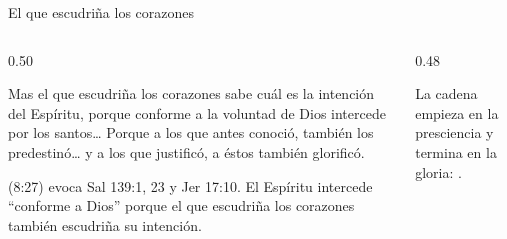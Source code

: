 \begin{frame}{El que escudriña los corazones}
\begin{columns}[c,onlytextwidth]
\begin{column}{0.50\textwidth}
\begin{cita}Mas el que escudriña los corazones sabe cuál es la intención del Espíritu, porque conforme a la voluntad de Dios intercede por los santos\ldots{} Porque a los que antes conoció, también los predestinó\ldots{} y a los que justificó, a éstos también glorificó.\end{cita}
\scriptsize{} (8:27) evoca Sal 139:1, 23 y Jer 17:10. El Espíritu intercede ``conforme a Dios'' porque el que escudriña los corazones también escudriña su intención.
\end{column}
\begin{column}{0.48\textwidth}
\centering
{}\par\smallskip
\scriptsize La cadena empieza en la presciencia y termina en la gloria: .
\end{column}
\end{columns}
\end{frame}

